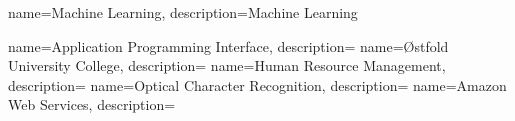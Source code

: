\RequirePackage{glossaries}
\makeglossaries

{
    name=Machine Learning,
    description={Machine Learning}
}

{
    name=Application Programming Interface,
    description={}
}
{
    name=Østfold University College,
    description={}
}
{
    name=Human Resource Management,
    description={}
}
{
    name=Optical Character Recognition,
    description={}
}
{
    name=Amazon Web Services,
    description={}
}
